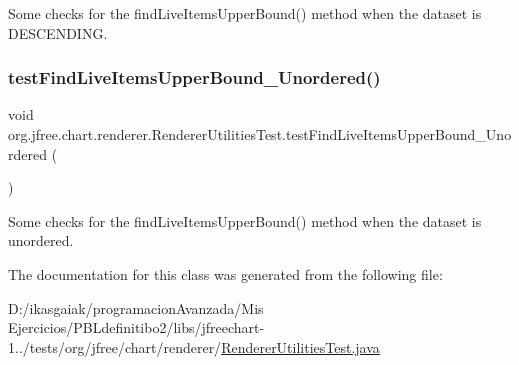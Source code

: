 Some checks for the find\+Live\+Items\+Upper\+Bound() method when the dataset is D\+E\+S\+C\+E\+N\+D\+I\+NG. \mbox{\label{classorg_1_1jfree_1_1chart_1_1renderer_1_1_renderer_utilities_test_afe7c9647e7a5d503f94564a204c0a10a}} 
\subsubsection{\texorpdfstring{test\+Find\+Live\+Items\+Upper\+Bound\+\_\+\+Unordered()}{testFindLiveItemsUpperBound\_Unordered()}}
{\footnotesize\ttfamily void org.\+jfree.\+chart.\+renderer.\+Renderer\+Utilities\+Test.\+test\+Find\+Live\+Items\+Upper\+Bound\+\_\+\+Unordered (\begin{DoxyParamCaption}{ }\end{DoxyParamCaption})}

Some checks for the find\+Live\+Items\+Upper\+Bound() method when the dataset is unordered. 

The documentation for this class was generated from the following file\+:\begin{DoxyCompactItemize}
\item 
D\+:/ikasgaiak/programacion\+Avanzada/\+Mis Ejercicios/\+P\+B\+Ldefinitibo2/libs/jfreechart-\/1../tests/org/jfree/chart/renderer/\mbox{\hyperlink{_renderer_utilities_test_8java}{Renderer\+Utilities\+Test.\+java}}\end{DoxyCompactItemize}
